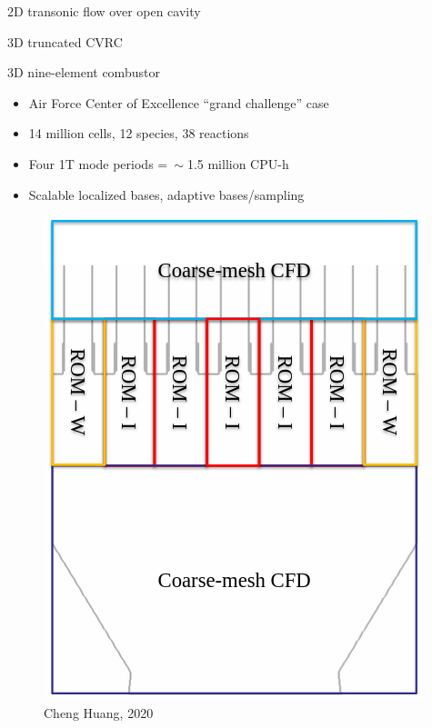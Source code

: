 \documentclass[]{beamer}
\begin{document}
\begin{frame}{2D transonic flow over open cavity}
    
\end{frame}

\begin{frame}{3D truncated CVRC}
    
\end{frame}

\begin{frame}{3D nine-element combustor}
	\begin{itemize}
		\item Air Force Center of Excellence ``grand challenge'' case
		\item 14 million cells, 12 species, 38 reactions
		\item Four 1T mode periods =$~\sim$1.5 million CPU-h
		\item Scalable localized bases, adaptive bases/sampling
	\end{itemize}
	\begin{minipage}{0.49\linewidth}
		\begin{figure}
		\end{figure}
	\end{minipage}
	\begin{minipage}{0.49\linewidth}
		\centering
		\begin{figure}
			\includegraphics[width=0.55\linewidth]{experiments/9elem/multicomponent.png}
			\caption*{\tiny{Cheng Huang, 2020}}
		\end{figure}
		\vspace{-3em}
	\end{minipage}
\end{frame}
\end{document}
